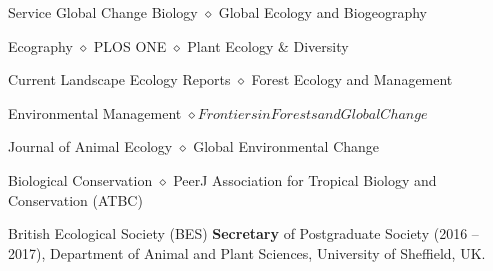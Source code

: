 
\begin{rubric}{Service}
    Global Change Biology $\diamond$ Global Ecology and Biogeography \par  Ecography $\diamond$ PLOS ONE $\diamond$ Plant Ecology \& Diversity \par Current Landscape Ecology Reports $\diamond$ Forest Ecology and Management \par Environmental Management  $\diamond Frontiers in Forests and Global Change $ \par Journal of Animal Ecology $\diamond$ Global Environmental Change \par Biological Conservation $\diamond$ PeerJ
	Association for Tropical Biology and Conservation (ATBC) 
	\par British Ecological Society (BES)
    \textbf{Secretary} of Postgraduate Society (2016 -- 2017), Department of Animal and Plant Sciences, University of Sheffield, UK.
\end{rubric}
